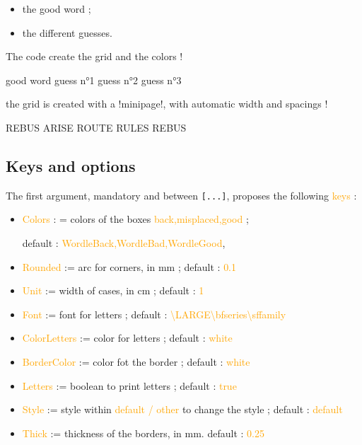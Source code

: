 \documentclass[english,a4paper,11pt]{article}
\newcommand\Cle[1]{{\small\sffamily\textlangle \textcolor{orange}{#1}\textrangle}}
\begin{document}
{\begin{cautionblock}
\begin{itemize}
	\item the good word ;
	\item the different guesses.
\end{itemize}

The code create the grid and the colors !
\end{cautionblock}

\begin{DemoCode}
\begin{WordleGrid}[keys]{good word}
	guess n°1
	guess n°2
	guess n°3
\end{WordleGrid}
\end{DemoCode}

\begin{noteblock}
the grid is created with a \motcletex!minipage!, with automatic width and spacings !
\end{noteblock}

\begin{DemoCode}[]
\begin{WordleGrid}{REBUS}
	ARISE
	ROUTE
	RULES
	REBUS
\end{WordleGrid}
\end{DemoCode}

\subsection{Keys and options}

\begin{tipblock}
The first argument, mandatory and between \texttt{[...]}, proposes the following \Cle{keys} :

\begin{itemize}
	\item \Cle{Colors} : = colors of the boxes \Cle{back,misplaced,good} ;
	
	\hfill{}default : \Cle{WordleBack,WordleBad,WordleGood},%
	\item \Cle{Rounded} := arc for corners, in mm ; \hfill{}default : \Cle{0.1}
	\item \Cle{Unit} := width of cases, in cm ; \hfill{}default : \Cle{1}
	\item \Cle{Font} := font for letters ; \hfill{}default : \Cle{\textbackslash LARGE\textbackslash bfseries\textbackslash sffamily}
	\item \Cle{ColorLetters} := color for letters ; \hfill{}default : \Cle{white}
	\item \Cle{BorderColor} := color fot the border ; \hfill{}default : \Cle{white}
	\item \Cle{Letters} := boolean to print letters ; \hfill{}default : \Cle{true}
	\item \Cle{Style} := style within \Cle{default / other} to change the style ; \hfill{}default : \Cle{default}
	\item \Cle{Thick} := thickness of the borders, in mm. \hfill{}default : \Cle{0.25}
\end{itemize}
\vspace*{-\baselineskip}\leavevmode
\end{tipblock}

}
\end{document}
